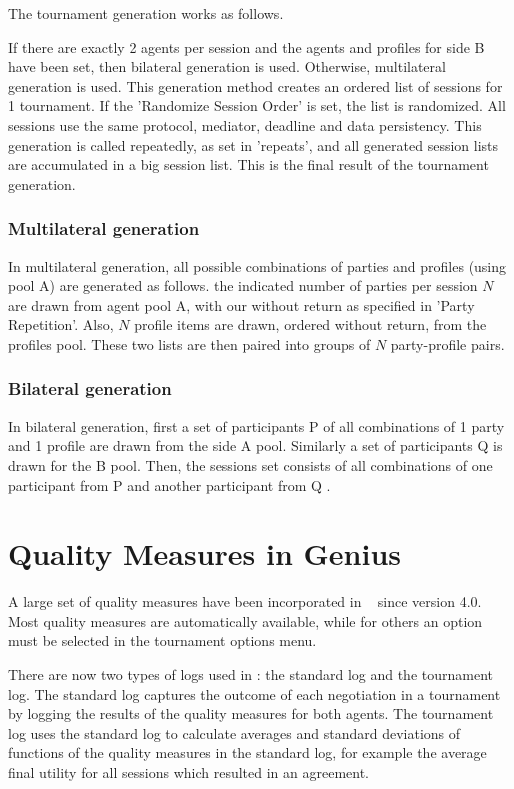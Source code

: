 \documentclass[]{article}
\begin{document}
The tournament generation works as follows. 

If there are exactly 2 agents per session and the agents and profiles for side B have been set, then bilateral generation is used. Otherwise, multilateral generation is used. This generation method creates an ordered list of sessions for 1 tournament.  If the 'Randomize Session Order' is set, the list is randomized. All sessions use the same protocol, mediator, deadline and data persistency.
This generation is called repeatedly, as set in 'repeats', and all generated session lists are accumulated in a big session list. This is the final result of the  tournament generation.

\subsubsection{Multilateral generation}
In multilateral generation,  all possible combinations of parties and profiles (using pool A) are generated as follows. the indicated number of parties per session $N$ are drawn from agent pool A, with our without return as specified in 'Party Repetition'. Also, $N$ profile items are drawn, ordered without return, from the profiles pool. These two lists are then paired into groups of $N$ party-profile pairs. 

\subsubsection{Bilateral generation}
In bilateral generation, first a set of participants P of all combinations of 1 party and 1 profile are drawn from the side A pool. Similarly a set of participants Q is drawn for the B pool. Then, the sessions set consists of all combinations of one participant from P and another participant from Q . 





\section{Quality Measures in Genius}\label{sec:qm}
A large set of quality measures have been incorporated in \Genius~ since version 4.0. Most quality measures are automatically available, while for others an option must be selected in the tournament options menu.

There are now two types of logs used in \Genius: the standard log and the tournament log. The standard log captures the outcome of each negotiation in a tournament by logging the results of the quality measures for both agents. The tournament log uses the standard log to calculate averages and standard deviations of functions of the quality measures in the standard log, for example the average final utility for all sessions which resulted in an agreement.
\end{document}
